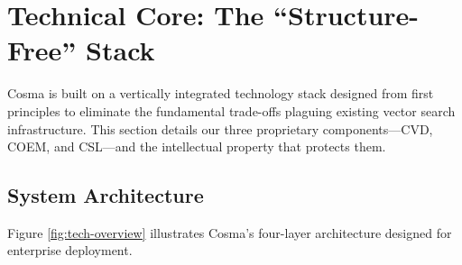 \section{Technical Core: The ``Structure-Free'' Stack}

Cosma is built on a vertically integrated technology stack designed from first principles to eliminate the fundamental trade-offs plaguing existing vector search infrastructure. This section details our three proprietary components—CVD, COEM, and CSL—and the intellectual property that protects them.

\subsection{System Architecture}

Figure \ref{fig:tech-overview} illustrates Cosma's four-layer architecture designed for enterprise deployment.

